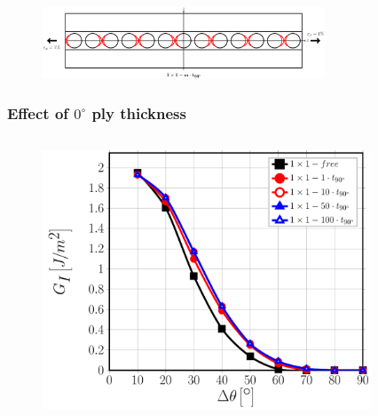\documentclass[first,firstsupp,lastsupp,last,hyperref,table]{ETHclass}
\begin{document}
\begin{frame}
\begin{columns}[c]
\begin{column}{0.5\textwidth}
\begin{figure}
\end{figure}
\end{column}
\end{columns}
\begin{figure}
\centering
\includegraphics[width=0.75\textwidth]{zeroplythickness.pdf}
\end{figure}
\end{frame}

\addtocounter{framenumber}{-1}

\begin{frame}
\frametitle{\vspace{0.2cm}\small Effect of $0^{\circ}$ ply thickness}
\vspace{-.75cm}
\centering
\begin{columns}[c]
\centering
\begin{column}{0.5\textwidth}
\centering
\begin{figure}
\centering
\includegraphics[width=\columnwidth]{1x1-i-vf60-GI-free.pdf}
\end{figure}
\end{column}
\begin{column}{0.5\textwidth}
\centering
\begin{figure}
\centering

\end{figure}
\end{column}
\end{columns}
\end{frame}
\end{document}
